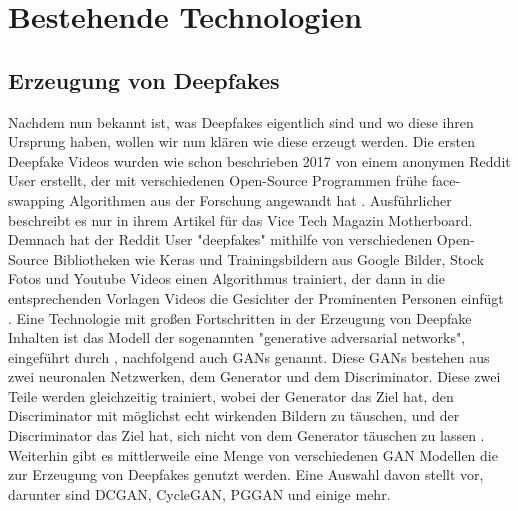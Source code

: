 \section{Bestehende Technologien}
\subsection{Erzeugung von Deepfakes}
Nachdem nun bekannt ist, was Deepfakes eigentlich sind und wo diese ihren Ursprung haben, wollen wir nun klären wie diese erzeugt werden.
Die ersten Deepfake Videos wurden wie schon beschrieben 2017 von einem anonymen Reddit User erstellt, 
der mit verschiedenen Open-Source Programmen frühe face-swapping Algorithmen aus der Forschung angewandt hat \cite{kernerPornDiscreditationEpistemic2021}. 
Ausführlicher beschreibt es nur \textcite{AIAssistedFakePorn2017} in ihrem Artikel für das Vice Tech Magazin Motherboard. 
Demnach hat der Reddit User "deepfakes" mithilfe von verschiedenen Open-Source Bibliotheken wie Keras und Trainingsbildern aus Google Bilder, 
Stock Fotos und Youtube Videos einen Algorithmus trainiert, der dann in die entsprechenden Vorlagen Videos die Gesichter der Prominenten Personen einfügt \cite{AIAssistedFakePorn2017}.
Eine Technologie mit großen Fortschritten in der Erzeugung von Deepfake Inhalten ist das Modell der sogenannten "generative adversarial networks", 
eingeführt durch \textcite{goodfellowGenerativeAdversarialNetworks2014}, nachfolgend auch GANs genannt. 
Diese GANs bestehen aus zwei neuronalen Netzwerken, dem Generator und dem Discriminator. 
Diese zwei Teile werden gleichzeitig trainiert, wobei der Generator das Ziel hat, den Discriminator mit möglichst echt wirkenden Bildern zu täuschen, 
und der Discriminator das Ziel hat, sich nicht von dem Generator täuschen zu lassen \cite{benaissaOverviewGANDeepFakesDetection2024}. 
Weiterhin gibt es mittlerweile eine Menge von verschiedenen GAN Modellen die zur Erzeugung von Deepfakes genutzt werden. 
Eine Auswahl davon stellt \textcite{benaissaOverviewGANDeepFakesDetection2024}vor, darunter sind DCGAN, CycleGAN, PGGAN und einige mehr.

